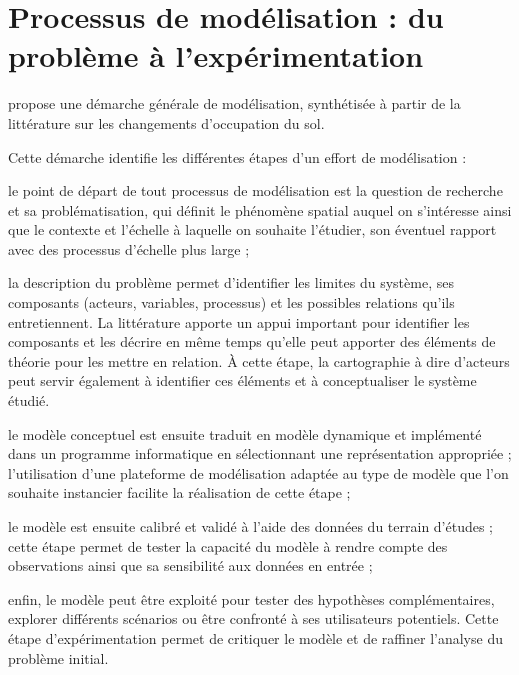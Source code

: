\section{Processus de modélisation : du problème à l'expérimentation}

\citet{magliocca_metastudies_2015} propose une démarche générale de modélisation,
synthétisée à partir de la littérature sur les changements d'occupation du sol.

\startplacefigure[location=middle,title={Processus de modélisation}]
\stopplacefigure

Cette démarche identifie les différentes étapes d'un effort de modélisation :

\startitemize[n]

\item le point de départ de tout processus de modélisation
   est la question de recherche et sa problématisation,
   qui définit le phénomène spatial auquel on s'intéresse
   ainsi que le contexte et l'échelle à laquelle on souhaite l'étudier,
   son éventuel rapport avec des processus d'échelle plus large ;

\item la description du problème permet d'identifier les limites du système,
   ses composants (acteurs, variables, processus)
   et les possibles relations qu'ils entretiennent.
   La littérature apporte
   un appui important pour identifier les composants et
   les décrire en même temps qu'elle peut apporter
   des éléments de théorie pour les mettre en relation.
   À cette étape, la cartographie à dire d'acteurs peut
   servir également à identifier ces éléments et à conceptualiser
   le système étudié.

\item le modèle conceptuel est ensuite traduit en modèle dynamique
   et implémenté dans un programme informatique
   en sélectionnant une représentation appropriée ;
   l'utilisation d'une plateforme de modélisation
   adaptée au type de modèle que l'on souhaite instancier
   facilite la réalisation de cette étape ;

\item le modèle est ensuite calibré et validé à l'aide des données
   du terrain d'études ; cette étape permet de tester la capacité
   du modèle à rendre compte des observations ainsi
   que sa sensibilité aux données en entrée ;

\item enfin, le modèle peut être exploité pour
   tester des hypothèses complémentaires, explorer
   différents scénarios ou être confronté à
   ses utilisateurs potentiels. Cette étape d'expérimentation
   permet de critiquer le modèle et de raffiner l'analyse du
   problème initial.

\stopitemize